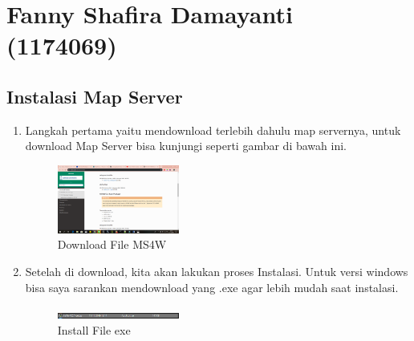 \section{Fanny Shafira Damayanti (1174069)}
\subsection{Instalasi Map Server}
\begin{enumerate}
    \item Langkah pertama yaitu mendownload terlebih dahulu map servernya, untuk download Map Server bisa kunjungi seperti gambar di bawah ini.
  \hfill\break
  \begin{figure}[H]
  \includegraphics[width=4cm]{figures/tugas4/1174069/1.png}
  \centering
  \caption{Download File MS4W}
  \end{figure}
    
   

    \item Setelah di download, kita akan lakukan proses Instalasi. Untuk versi windows bisa saya sarankan mendownload yang .exe agar lebih mudah saat instalasi.
   
    
  \hfill\break
  \begin{figure}[H]
  \includegraphics[width=4cm]{figures/tugas4/1174069/2.png}
  \centering
  \caption{Install File exe}
  \end{figure}
    
    

\end{enumerate}


